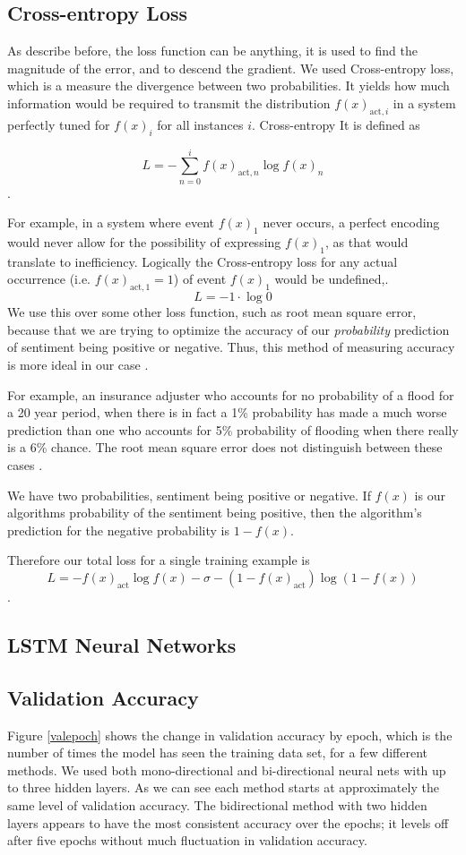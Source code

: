 \documentclass[titlepage,letterpaper]{article}
\begin{document}
\subsection{Cross-entropy Loss}
As describe before, the loss function can be anything, it is used to find the magnitude of the error, and to descend the gradient. We used Cross-entropy loss, which is a measure the divergence between two probabilities. It yields how much information would be required to transmit the distribution \(f(x)_{\text{act},i} \) in a system perfectly tuned for \(f(x)_i \) for all instances \(i\). Cross-entropy It is defined as \cite{NeuralNet}

\[L = -\sum_{n=0}^i f(x)_{\text{act},n} \log f(x)_n\]. 

For example, in a system where event \(f(x)_1\) never occurs, a perfect encoding would never allow for the possibility of expressing \(f(x)_1\), as that would translate to inefficiency. Logically the Cross-entropy loss for any actual occurrence (i.e. \(f(x)_{\text{act},1}= 1\)) of  event \(f(x)_1\) would be undefined,.
\[L = -1\cdot\log 0 \]
We use this over some other loss function, such as root mean square error, because that we are trying to optimize the accuracy of our \textit{probability} prediction of sentiment being positive or negative. Thus, this method of measuring accuracy is more ideal in our case . 

For example, an insurance adjuster who accounts for no probability of a flood for a 20 year period, when there is in fact a 1\% probability has made a much worse prediction than one who accounts for 5\% probability of flooding when there really is a 6\% chance. The root mean square error does not distinguish between these cases \cite{NeuralNet}.

We have two probabilities, sentiment being positive or negative. If \(f(x)\) is our algorithms probability of the sentiment being positive, then the algorithm's prediction for the negative probability is \(1-f(x)\).

Therefore our total loss for a single training example is
\[L = - f(x)_\text{act} \log f(x) -\sigma -(1-f(x)_\text{act}) \log (1-f(x))\].

\subsection{LSTM Neural Networks} \label{lstm_sec}

\subsection{Validation Accuracy}
Figure \ref{valepoch} shows the change in validation accuracy by epoch, which is the number of times the model has seen the training data set, for a few different methods. We used both mono-directional and bi-directional neural nets with up to three hidden layers. As we can see each method starts at approximately the same level of validation accuracy. The bidirectional method with two hidden layers appears to have the most consistent accuracy over the epochs; it levels off after five epochs without much fluctuation in validation accuracy. 
\end{document}
